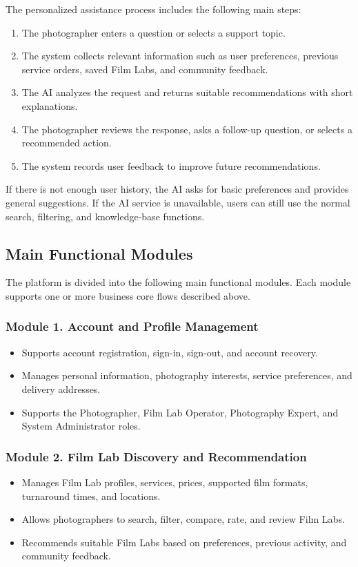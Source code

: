 The personalized assistance process includes the following main steps:
\begin{enumerate}
    \item The photographer enters a question or selects a support topic.
    \item The system collects relevant information such as user preferences,
    previous service orders, saved Film Labs, and community feedback.
    \item The AI analyzes the request and returns suitable recommendations with
    short explanations.
    \item The photographer reviews the response, asks a follow-up question, or
    selects a recommended action.
    \item The system records user feedback to improve future recommendations.
\end{enumerate}

If there is not enough user history, the AI asks for basic preferences and
provides general suggestions. If the AI service is unavailable, users can still
use the normal search, filtering, and knowledge-base functions.

\subsection*{Main Functional Modules}

The platform is divided into the following main functional modules. Each
module supports one or more business core flows described above.

\subsubsection*{Module 1. Account and Profile Management}
\begin{itemize}
    \item Supports account registration, sign-in, sign-out, and account recovery.
    \item Manages personal information, photography interests, service
    preferences, and delivery addresses.
    \item Supports the Photographer, Film Lab Operator, Photography Expert, and
    System Administrator roles.
\end{itemize}

\subsubsection*{Module 2. Film Lab Discovery and Recommendation}
\begin{itemize}
    \item Manages Film Lab profiles, services, prices, supported film formats,
    turnaround times, and locations.
    \item Allows photographers to search, filter, compare, rate, and review Film
    Labs.
    \item Recommends suitable Film Labs based on preferences, previous activity,
    and community feedback.
\end{itemize}

